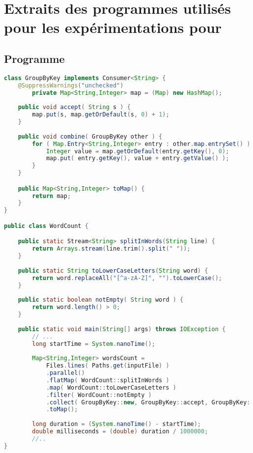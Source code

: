 \chapter{Extraits des programmes utilisés pour les expérimentations pour }
\label{appendice-code-experiences.ann}

\section{Programme }

\begin{lstlisting}[basicstyle=\ttfamily\footnotesize,language=java]
class GroupByKey implements Consumer<String> {
    @SuppressWarnings("unchecked")
        private Map<String,Integer> map = (Map) new HashMap();
    
    public void accept( String s ) {
        map.put(s, map.getOrDefault(s, 0) + 1);
    }
    
    public void combine( GroupByKey other ) {
        for ( Map.Entry<String,Integer> entry : other.map.entrySet() ) {
            Integer value = map.getOrDefault(entry.getKey(), 0);
            map.put( entry.getKey(), value + entry.getValue() );
        } 
    }

    public Map<String,Integer> toMap() {
        return map;
    }
}

public class WordCount {

    public static Stream<String> splitInWords(String line) {
        return Arrays.stream(line.trim().split(" "));
    }
    
    public static String toLowerCaseLetters(String word) {
        return word.replaceAll("[^a-zA-Z]", "").toLowerCase();
    }
    
    public static boolean notEmpty( String word ) {
        return word.length() > 0;
    }
    
    public static void main(String[] args) throws IOException {
        // ...
        long startTime = System.nanoTime();
        
        Map<String,Integer> wordsCount = 
            Files.lines( Paths.get(inputFile) )
            .parallel()
            .flatMap( WordCount::splitInWords )
            .map( WordCount::toLowerCaseLetters )
            .filter( WordCount::notEmpty )
            .collect( GroupByKey::new, GroupByKey::accept, GroupByKey::combine )
            .toMap();
        
        long duration = (System.nanoTime() - startTime);
        double milliseconds = (double) duration / 1000000;
        //..
}        
\end{lstlisting}


